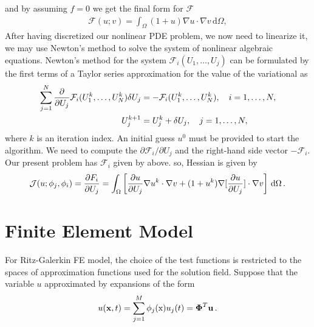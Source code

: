 \documentclass[]{article}
\begin{document}
and by assuming $f=0$ we get the final form for $\mathcal{F}$
\begin{equation}\label{eq11}
	\begin{aligned}
		\mathcal{F}(u; v) = \int_\Omega (1+u)\nabla u\cdot \nabla v \, \mathrm{d}\Omega,
	\end{aligned}
\end{equation}
After having discretized our nonlinear PDE problem, we now need to linearize it, we may use Newton’s method to solve the system of nonlinear algebraic equations. Newton’s method for the system $\mathcal{F}_i(U_1,\ldots,U_j)$ can be formulated by the first terms of a Taylor series approximation for the value of the variational as
\begin{equation}\label{eq12}
	\begin{aligned}
		\sum_{j=1}^N {\partial \over\partial U_j} \mathcal{F}_i(U_1^k,\ldots,U_N^k)\delta U_j &= -\mathcal{F}_i(U_1^k,\ldots,U_N^k),\quad i=1, \ldots ,N,\\ U_j^{k+1} &= U_j^k + \delta U_j,\quad j=1, \ldots ,N,
	\end{aligned}
\end{equation}
where $k$ is an iteration index. An initial guess $u^0$ must be provided to start the algorithm. We need to compute the $\partial \mathcal{F}_i/\partial U_j$ and the right-hand side vector $-\mathcal{F}_i$. Our present problem has $\mathcal{F}_i$ given by above. so, Hessian is given by
\begin{equation}\label{eq13}
	\begin{aligned}
		\mathcal{J}(u;\phi_j,\phi_i) = {\partial F_i\over\partial U_j} = \int_\Omega \left\lbrack \frac{\partial u}{\partial U_j} \nabla u^k \cdot \nabla v + (1+u^k) \nabla [\frac{\partial u}{\partial U_j}] \cdot \nabla v \right\rbrack \, \mathrm{d}\Omega\thinspace .
	\end{aligned}
\end{equation}
\section{Finite Element Model} \label{sec: fem}
For Ritz-Galerkin FE model, the choice of the test functions is restricted to the spaces of approximation functions used for the solution field. Suppose that the variable $u$ approximated by expansions of the form
\begin{equation}\label{eq14}
	\begin{aligned}
		u(\mathbf{x}, t)= \sum_{j=1}^{M} \phi_j(\mathrm{x}) u_j(t) = \boldsymbol{\Phi}^T\mathbf{u} \thinspace.
	\end{aligned}
\end{equation}
\end{document}
